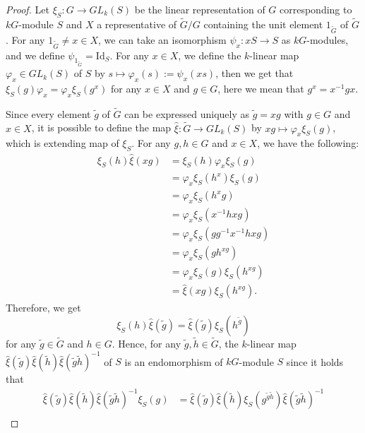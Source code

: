 \documentclass[pdftex,a4paper]{article}
\numberwithin{equation}{subsection}
\theoremstyle{definition}
\newcommand{\Id}{\mathrm{Id}}
\begin{document}
\begin{proof}
	Let \(\xi_S\colon G\rightarrow GL_k(S)\) be the linear representation of \(G\) corresponding to \(kG\)-module \(S\) and \(X\) a representative of \(\tilde{G}/G\) containing the unit element \(1_{\tilde{G}}\) of \(\tilde{G}\).
	For any \(1_{\tilde{G}}\neq x\in X\), we can take an isomorphism \(\psi_x\colon xS\rightarrow S\) as \(kG\)-modules, and we define \(\psi_{1_{\tilde{G}}}=\Id_S\).
	For any \(x\in X\), we define the \(k\)-linear map \(\varphi_x \in GL_k(S)\) of \(S\) by \(s\mapsto \varphi_x(s):=\psi_x(xs)\), then we get that \(\xi_S(g)\varphi_x=\varphi_x\xi_S(g^x)\) for any \(x\in X\) and \(g\in G\), here we mean that \(g^x=x^{-1}gx\).

	Since every element \(\tilde{g}\) of \(\tilde{G}\) can be expressed uniquely as \(\tilde{g}=xg\) with \(g \in G\) and \(x\in X\), it is possible to define the map \(\hat{\xi}: \tilde{G} \rightarrow GL_k(S)\) by \(xg\mapsto \varphi_x \xi_S(g)\), which is extending map of \(\xi_S\).
	For any \(g,h\in G\) and \(x\in X\), we have the following:
	\begin{align}
		\xi_S(h)\hat{\xi}(xg)
		 & = \xi_S(h)\varphi_x\xi_S(g)        \\
		 & = \varphi_x\xi_S(h^x)\xi_S(g)      \\
		 & = \varphi_x\xi_S(h^xg)             \\
		 & = \varphi_x\xi_S(x^{-1}hxg)        \\
		 & = \varphi_x\xi_S(gg^{-1}x^{-1}hxg) \\
		 & = \varphi_x\xi_S(gh^{xg})          \\
		 & = \varphi_x\xi_S(g)\xi_S(h^{xg})   \\
		 & = \hat{\xi}(xg)\xi_S(h^{xg}).
	\end{align}
	Therefore, we get
	\begin{equation}
		\xi_S(h)\hat{\xi}(\tilde{g})=\hat{\xi}(\tilde{g})\xi_S(h^{\tilde{g}})
	\end{equation}
	for any \(\tilde{g}\in \tilde{G}\) and \(h\in G\).
	Hence, for any \(\tilde{g}, \tilde{h}\in \tilde{G}\), the \(k\)-linear map
	\(\hat{\xi}(\tilde{g})\hat{\xi}(\tilde{h})\hat{\xi}(\tilde{g}\tilde{h})^{-1}\) of \(S\) is an endomorphism of \(kG\)-module \(S\) since it holds that
	\begin{align}
		\hat{\xi}(\tilde{g})\hat{\xi}(\tilde{h})\hat{\xi}(\tilde{g}\tilde{h})^{-1}\xi_S(g)
		 & =\hat{\xi}(\tilde{g})\hat{\xi}(\tilde{h})\xi_S(g^{\tilde{g}\tilde{h}})\hat{\xi}(\tilde{g}\tilde{h})^{-1} \\

\end{align}
\end{proof}
\end{document}
